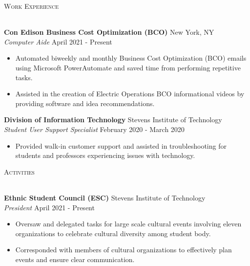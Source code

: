 \documentclass[10pt]{article}
\newcommand{\lineunder} {
    \vspace*{-8pt} \\
    \hspace*{-18pt} \hrulefill \\
}
\newcommand{\header} [1] {
    {\hspace*{-18pt}\vspace*{6pt} \textsc{#1}}
    \vspace*{-6pt} \lineunder
}
\begin{document}
\header{Work Experience}
\vspace{1mm}

\textbf{Con Edison Business Cost Optimization (BCO)} \hfill New York, NY\\
\textit{Computer Aide} \hfill April 2021 - Present\\
\vspace{-1mm}
\begin{itemize} \itemsep 1pt
    \item Automated biweekly and monthly Business Cost Optimization (BCO) emails using Microsoft PowerAutomate and saved time from performing repetitive tasks.
    \item Assisted in the creation of Electric Operations BCO informational videos by providing software and idea recommendations. 
\end{itemize}

\textbf{Division of Information Technology} \hfill Stevens Institute of Technology\\
\textit{Student User Support Specialist} \hfill February 2020 - March 2020\\
\vspace{-1mm}
\begin{itemize} \itemsep 1pt
	\item Provided walk-in customer support and assisted in troubleshooting for students and professors experiencing issues with technology.
\end{itemize}

\header{Activities}
\vspace{1mm}

\textbf{Ethnic Student Council (ESC)} \hfill Stevens Institute of Technology\\
\textit{President} \hfill April 2021 - Present\\
\vspace{-1mm}
\begin{itemize} \itemsep 1pt
    \item Oversaw and delegated tasks for large scale cultural events involving eleven organizations to celebrate cultural diversity among student body.
    \item Corresponded with members of cultural organizations to effectively plan events and ensure clear communication.
\end{itemize}
\end{document}
